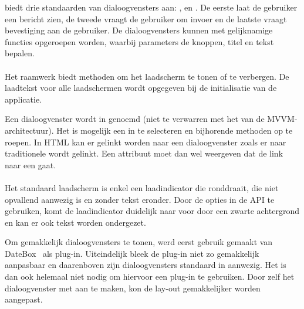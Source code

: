 \st{} biedt drie standaarden van dialoogvensters aan: ,  en .
De eerste laat de gebruiker een bericht zien,  de tweede vraagt de gebruiker om invoer en de laatste vraagt bevestiging aan de gebruiker.
De dialoogvensters kunnen met gelijknamige functies opgeroepen worden,  waarbij parameters de knoppen, titel en tekst bepalen.

\paragraph{\kendo}
Het raamwerk biedt methoden om het laadscherm te tonen of te verbergen.
De laadtekst voor alle laadschermen wordt opgegeven bij de initialisatie van de applicatie.

Een dialoogvenster wordt in \kendo{}  genoemd (niet te verwarren met het  van de MVVM-architectuur).
Het is mogelijk een  in \js{} te selecteren en bijhorende methoden op te roepen.
In HTML kan er gelinkt worden naar een dialoogvenster zoals er naar traditionele  wordt gelinkt.
Een attribuut moet dan wel weergeven dat de link naar een  gaat.

\paragraph{\jqm}
Het standaard laadscherm is enkel een laadindicator die ronddraait, die niet opvallend aanwezig is en zonder tekst eronder.
Door de opties in de API te gebruiken, komt de laadindicator duidelijk naar voor door een zwarte achtergrond en kan er ook tekst worden ondergezet.

Om gemakkelijk dialoogvensters te tonen, werd eerst gebruik gemaakt van DateBox~\cite{Sage2013} als plug-in.
Uiteindelijk bleek de plug-in niet zo gemakkelijk aanpasbaar en daarenboven zijn dialoogvensters standaard in \jqm{} aanwezig.
Het is dan ook helemaal niet nodig om hiervoor een plug-in te gebruiken.
Door zelf het dialoogvenster met \jqm{} aan te maken, kon de lay-out gemakkelijker worden aangepast.

